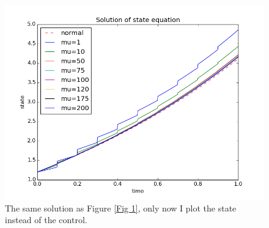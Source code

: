\documentclass[11pt,a4paper]{article}
\begin{document}
\begin{figure}
  \includegraphics[width=\linewidth]{test1_PC_state.png}
  \caption{The same solution as Figure \ref{Fig 1}, only now I plot the state instead of the control.}
  \label{Fig 2}
\end{figure}


\end{document}
